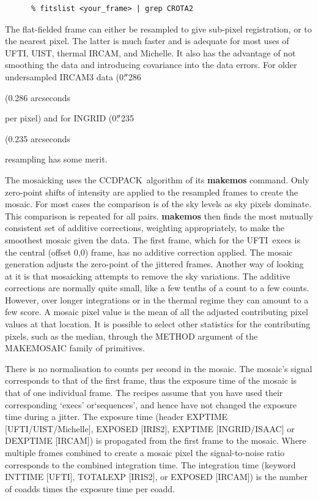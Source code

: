 \documentclass[twoside,11pt]{article}
\newcommand{\htmladdnormallink}[2]{#1}
\newenvironment{latexonly}{}{}
\newcommand{\xref}[3]{#1}
\renewcommand{\_}{\texttt{\symbol{95}}}
\newcommand{\arcm}{\hbox{$^\prime$}}
\newcommand{\arcm}{{\rawhtml &acute;}}
\newcommand{\arcsec}{\arcm\hskip -0.1em\arcm}
\newcommand{\arcsec}{{\rawhtml &quot;}}
\newcommand{\uarcs}{\hskip-0.27em\arcsec\hskip-0.02em}
\newcommand{\uarcs}{{\rawhtml &quot;}}
\newcommand{\CCDPACK}{{\footnotesize CCDPACK}}
\newcommand{\IRCAM}{\htmladdnormallink{IRCAM}{http://www.jach.hawaii.edu/JACpublic/UKIRT/instruments/ircam/ircam3.html}}
\newcommand{\Michelle}{\htmladdnormallink{Michelle}{http://www.jach.hawaii.edu/JACpublic/UKIRT/instruments/michelle/michelle.html}}
\newcommand{\UIST}{\htmladdnormallink{UIST}{http://www.jach.hawaii.edu/JACpublic/UKIRT/instruments/uist/uist.html}}
\newcommand{\UFTI}{\htmladdnormallink{UFTI}{http://www.jach.hawaii.edu/JACpublic/UKIRT/instruments/ufti/ufti.html}}
\begin{document}
\begin{verbatim}
      % fitslist <your_frame> | grep CROTA2
\end{verbatim}

The flat-fielded frame can either be resampled to give sub-pixel
registration, or to the nearest pixel.  The latter is much faster and
is adequate for most uses of \UFTI, \UIST, thermal \IRCAM, and \Michelle.  It also
has the advantage of not smoothing the data and introducing covariance
into the data errors.  For older
undersampled IRCAM3 data
\begin{latexonly}
(0.$\uarcs$286
\end{latexonly}
\begin{htmlonly}
(0.286 arcseconds
\end{htmlonly}
per pixel) and for INGRID 
\begin{latexonly}
(0.$\uarcs$235
\end{latexonly}
\begin{htmlonly}
(0.235 arcseconds
\end{htmlonly}
resampling has some merit.

The mosaicking uses the \xref{\CCDPACK\ algorithm}{sun139}{mosaicing}
of its \xref{{\bf makemos}}{sun139}{MAKEMOS} command.  Only zero-point
shifts of intensity are applied to the resampled frames to create the
mosaic.  For most cases the comparison is of the sky levels as sky
pixels dominate.  This comparison is repeated for all pairs.  {\bf
makemos} then finds the most mutually consistent set of additive
corrections, weighting appropriately, to make the smoothest mosaic
given the data. The first frame, which for the \UFTI\ execs is the
central (offset 0,0) frame, has no additive correction applied.  The
mosaic generation adjusts the zero-point of the jittered frames.
Another way of looking at it is that mosaicking attempts to remove the
sky variations.  The additive corrections are normally quite small,
like a few tenths of a count to a few counts.  However, over longer
integrations or in the thermal regime they can amount to a few score.
A mosaic pixel value is the mean of all the adjusted contributing
pixel values at that location.  It is possible to select other
statistics for the contributing pixels, such as the median, through
the METHOD argument of the \_MAKE\_MOSAIC\_ family of primitives.

There is no normalisation to counts per second in the mosaic. The
mosaic's signal corresponds to that of the first frame, thus the
exposure time of the mosaic is that of one individual frame.  The
recipes assume that you have used their corresponding `execs'
or`sequences', and hence have not changed the exposure time during a
jitter.  The exposure time (header EXP\_TIME [UFTI/UIST/Michelle],
EXPOSED [IRIS2], EXPTIME [INGRID/ISAAC] or DEXPTIME [IRCAM]) is
propagated from the first frame to the mosaic.  Where multiple frames
combined to create a mosaic pixel the signal-to-noise ratio
corresponds to the combined integration time.  The integration time
(keyword INT\_TIME [UFTI], TOTALEXP [IRIS2], or EXPOSED [IRCAM]) is
the number of coadds times the exposure time per coadd.
\end{document}
